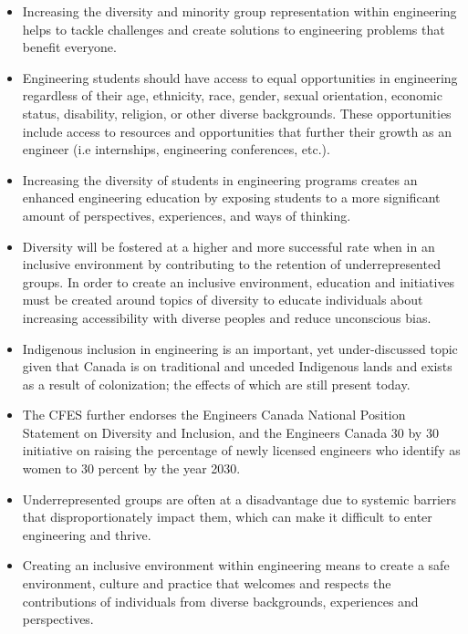 \begin{itemize}
 \item Increasing the diversity and minority group representation within engineering helps to tackle challenges and create solutions to engineering problems that benefit everyone.
 \item Engineering students should have access to equal opportunities in engineering regardless of their age, ethnicity, race, gender, sexual orientation, economic status, disability, religion, or other diverse backgrounds. These opportunities include access to resources and opportunities that further their growth as an engineer (i.e internships, engineering conferences, etc.).
 \item Increasing the diversity of students in engineering programs creates an enhanced engineering education by exposing students to a more significant amount of perspectives, experiences, and ways of thinking.
 \item Diversity will be fostered at a higher and more successful rate when in an inclusive environment by contributing to the retention of underrepresented groups. In order to create an inclusive environment, education and initiatives must be created around topics of diversity to educate individuals about increasing accessibility with diverse peoples and reduce unconscious bias.
 \item Indigenous inclusion in engineering is an important, yet under-discussed topic given that Canada is on traditional and unceded Indigenous lands and exists as a result of colonization; the effects of which are still present today.
 \item The CFES further endorses the Engineers Canada National Position Statement on Diversity and Inclusion, and the Engineers Canada 30 by 30 initiative on raising the percentage of newly licensed engineers who identify as women to 30 percent by the year 2030.
 \item Underrepresented groups are often at a disadvantage due to systemic barriers that disproportionately impact them, which can make it difficult to enter engineering and thrive.
 \item Creating an inclusive environment within engineering means to create a safe environment, culture and practice that welcomes and respects the contributions of individuals from diverse backgrounds, experiences and perspectives.
\end{itemize}

